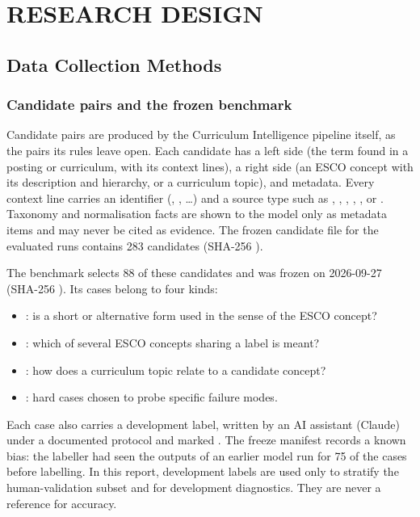 \chapter{RESEARCH DESIGN}
\label{ch:research}

\section{Data Collection Methods}
\label{sec:datacollection}

\subsection{Candidate pairs and the frozen benchmark}

Candidate pairs are produced by the Curriculum Intelligence pipeline itself, as the pairs its rules leave open. Each candidate has a left side (the term found in a posting or curriculum, with its context lines), a right side (an ESCO concept with its description and hierarchy, or a curriculum topic), and metadata. Every context line carries an identifier (, , \ldots) and a source type such as , , , , ,  or . Taxonomy and normalisation facts are shown to the model only as metadata items and may never be cited as evidence. The frozen candidate file for the evaluated runs contains 283 candidates (SHA-256 ).

The benchmark  selects 88 of these candidates and was frozen on 2026-09-27 (SHA-256 ). Its cases belong to four kinds:
\begin{itemize}
    \item {}: is a short or alternative form used in the sense of the ESCO concept?
    \item {}: which of several ESCO concepts sharing a label is meant?
    \item {}: how does a curriculum topic relate to a candidate concept?
    \item {}: hard cases chosen to probe specific failure modes.
\end{itemize}
Each case also carries a development label, written by an AI assistant (Claude) under a documented protocol and marked . The freeze manifest records a known bias: the labeller had seen the outputs of an earlier model run for 75 of the cases before labelling. In this report, development labels are used only to stratify the human-validation subset and for development diagnostics. They are never a reference for accuracy.

